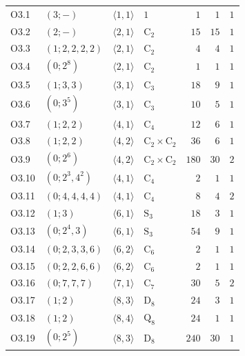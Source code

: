\begin{center}
\begin{longtable}{|l|l|l|l|r|r|r|}
O3.1 & $(3; -)$ & $\langle 1, 1 \rangle$ & {\small $1$} & $1$ & $1$ & $1$ \\
O3.2 & $(2; -)$ & $\langle 2, 1 \rangle$ & {\small $\mathrm{C}_{2}$} & $15$ & $15$ & $1$ \\
O3.3 & $(1; 2, 2, 2, 2)$ & $\langle 2, 1 \rangle$ & {\small $\mathrm{C}_{2}$} & $4$ & $4$ & $1$ \\
O3.4 & $(0; 2^8)$ & $\langle 2, 1 \rangle$ & {\small $\mathrm{C}_{2}$} & $1$ & $1$ & $1$ \\
O3.5 & $(1; 3, 3)$ & $\langle 3, 1 \rangle$ & {\small $\mathrm{C}_{3}$} & $18$ & $9$ & $1$ \\
O3.6 & $(0; 3^5)$ & $\langle 3, 1 \rangle$ & {\small $\mathrm{C}_{3}$} & $10$ & $5$ & $1$ \\
O3.7 & $(1; 2, 2)$ & $\langle 4, 1 \rangle$ & {\small $\mathrm{C}_{4}$} & $12$ & $6$ & $1$ \\
O3.8 & $(1; 2, 2)$ & $\langle 4, 2 \rangle$ & {\small $\mathrm{C}_{2} \times \mathrm{C}_{2}$} & $36$ & $6$ & $1$ \\
O3.9 & $(0; 2^6)$ & $\langle 4, 2 \rangle$ & {\small $\mathrm{C}_{2} \times \mathrm{C}_{2}$} & $180$ & $30$ & $2$ \\
O3.10 & $(0; 2^3, 4^2)$ & $\langle 4, 1 \rangle$ & {\small $\mathrm{C}_{4}$} & $2$ & $1$ & $1$ \\
O3.11 & $(0; 4, 4, 4, 4)$ & $\langle 4, 1 \rangle$ & {\small $\mathrm{C}_{4}$} & $8$ & $4$ & $2$ \\
O3.12 & $(1; 3)$ & $\langle 6, 1 \rangle$ & {\small $\mathrm{S}_{3}$} & $18$ & $3$ & $1$ \\
O3.13 & $(0; 2^4, 3)$ & $\langle 6, 1 \rangle$ & {\small $\mathrm{S}_{3}$} & $54$ & $9$ & $1$ \\
O3.14 & $(0; 2, 3, 3, 6)$ & $\langle 6, 2 \rangle$ & {\small $\mathrm{C}_{6}$} & $2$ & $1$ & $1$ \\
O3.15 & $(0; 2, 2, 6, 6)$ & $\langle 6, 2 \rangle$ & {\small $\mathrm{C}_{6}$} & $2$ & $1$ & $1$ \\
O3.16 & $(0; 7, 7, 7)$ & $\langle 7, 1 \rangle$ & {\small $\mathrm{C}_{7}$} & $30$ & $5$ & $2$ \\
O3.17 & $(1; 2)$ & $\langle 8, 3 \rangle$ & {\small $ \mathrm{D}_{8}$} & $24$ & $3$ & $1$ \\
O3.18 & $(1; 2)$ & $\langle 8, 4 \rangle$ & {\small $ \mathrm{Q}_{8}$} & $24$ & $1$ & $1$ \\
O3.19 & $(0; 2^5)$ & $\langle 8, 3 \rangle$ & {\small $ \mathrm{D}_{8}$} & $240$ & $30$ & $1$ \\

\end{longtable}
\end{center}
